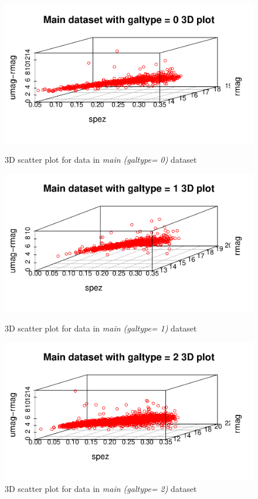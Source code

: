 \documentclass{article}
\begin{document}
\begin{enumerate}[1.]
\begin{figure}
\includegraphics{mainGroup0.pdf}
\caption{ 3D scatter plot for data in \emph{main (galtype= 0)} dataset}

\includegraphics{mainGroup1.pdf}
\caption{ 3D scatter plot for data in \emph{main (galtype= 1)} dataset}

\includegraphics{mainGroup2.pdf}
\caption{ 3D scatter plot for data in \emph{main (galtype= 2)} dataset}
\end{figure}


\end{enumerate}
\end{document}
